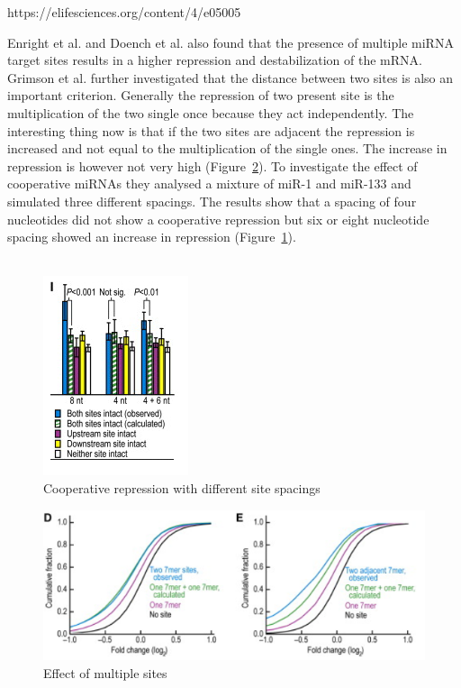 \documentclass[12pt]{article}
\begin{document}
https://elifesciences.org/content/4/e05005

Enright et al. \cite{Enright} and Doench et al. \cite{Doench} also found that the presence of multiple miRNA target sites results in a higher repression and destabilization of the mRNA. Grimson et al. \cite{Grimson} further investigated that the distance between two sites is also an important criterion. Generally the repression of two present site is the multiplication of the two single once because they act independently. The interesting thing now is that if the two sites are adjacent the repression is increased and not equal to the multiplication of the single ones. The increase in repression is however not very high (Figure~\ref{sitedistance}). To investigate the effect of cooperative miRNAs they analysed a mixture of miR-1 and miR-133 and simulated three different spacings. The results show that a spacing of four nucleotides did not show a cooperative repression but six or eight nucleotide spacing showed an increase in repression (Figure~\ref{sitespacing}).\\\\

\begin{figure}
\centering
\includegraphics[scale=1.2]{results/sites_8nt.PNG}  
\caption{Cooperative repression with different site spacings}
\label{sitespacing}
\end{figure}

\begin{figure}
\centering
\includegraphics[scale=0.7]{results/sites_distance.PNG}
\caption{Effect of multiple sites}
\label{sitedistance}
\end{figure}
\end{document}

